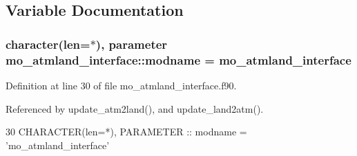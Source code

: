 \subsection{Variable Documentation}
\hypertarget{namespacemo__atmland__interface_ab0a7407e48789dbb1c7fef4404d595f4}{}
\subsubsection[{modname}]{\setlength{\rightskip}{0pt plus 5cm}character(len=$\ast$), parameter mo\+\_\+atmland\+\_\+interface\+::modname = \textquotesingle{}mo\+\_\+atmland\+\_\+interface\textquotesingle{}}\label{namespacemo__atmland__interface_ab0a7407e48789dbb1c7fef4404d595f4}


Definition at line 30 of file mo\+\_\+atmland\+\_\+interface.\+f90.



Referenced by update\+\_\+atm2land(), and update\+\_\+land2atm().


\begin{DoxyCode}
30   \textcolor{keywordtype}{CHARACTER(len=*)}, \textcolor{keywordtype}{PARAMETER} :: modname = \textcolor{stringliteral}{'mo\_atmland\_interface'}
\end{DoxyCode}
